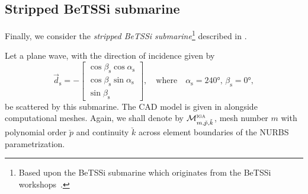 \subsection{Stripped BeTSSi submarine}
Finally, we consider the \textit{stripped BeTSSi submarine}\footnote{Based upon the BeTSSi submarine which originates from the BeTSSi workshops~\cite{Gilroy2013bib}.} described in . 

Let a plane wave, with the direction of incidence given by
\begin{equation}
	\vec{d}_{\mathrm{s}} = -\begin{bmatrix}
		\cos\beta_{\mathrm{s}}\cos\alpha_{\mathrm{s}}\\
		\cos\beta_{\mathrm{s}}\sin\alpha_{\mathrm{s}}\\
		\sin\beta_{\mathrm{s}}
	\end{bmatrix}, \quad\text{where}\quad \alpha_{\mathrm{s}} = \ang{240},\,\beta_{\mathrm{s}} = \ang{0},
\end{equation}
be scattered by this submarine. The CAD model is given in  alongside computational meshes. Again, we shall denote by ${\cal M}_{m,\check{p},\check{k}}^{\textsc{iga}}$, mesh number $m$ with polynomial order $\check{p}$ and continuity $\check{k}$ across element boundaries of the NURBS parametrization. 

